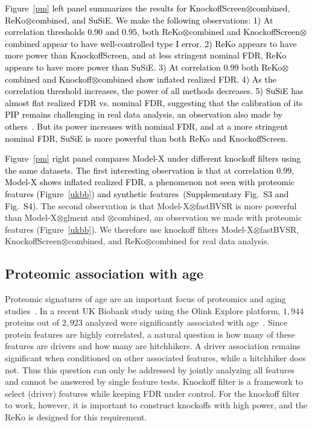 \documentclass[12pt,Times]{article}
\def\cite{\citep}
\def\tcb{\textcolor{black}}
\begin{document}
 \tcb{Figure~\ref{pm} left panel summarizes the results for KnockoffScreen\allowbreak$\otimes$combined,  ReKo$\otimes$combined, and SuSiE.  We make the following observations:  1) At correlation thresholds $0.90$ and $0.95$, both ReKo\allowbreak$\otimes$combined and KnockoffScreen\allowbreak$\otimes$combined  appear to have well-controlled type I error.  2) ReKo appears to have more power than KnockoffScreen, and at less stringent nominal FDR, ReKo appears to have more power than SuSiE.  3) At correlation $0.99$ both ReKo\allowbreak$\otimes$combined and Knockoff\allowbreak$\otimes$combined show inflated realized FDR.   4) As the correlation threshold increases, the power of all methods decreases. 5) SuSiE has almost flat realized FDR vs. nominal FDR, suggesting that the calibration of its PIP remains challenging in real data analysis, an observation also made by others~\cite{susie-inf}. But its power increases with nominal FDR, and at a more stringent nominal FDR, SuSiE is more powerful than both ReKo and KnockoffScreen. }

\tcb{Figure~\ref{pm} right panel compares Model-X under different knockoff filters using the same datasets. The first interesting observation is that at correlation $0.99$, Model-X shows inflated realized FDR, a phenomenon not seen with proteomic features (Figure~\ref{ukbb}) and synthetic features~(Supplementary Fig.~S3 and Fig.~S4). } The second observation is that Model-X\allowbreak$\otimes$fastBVSR is more powerful than Model-X\allowbreak$\otimes$glment and $\otimes$combined, an observation we made with proteomic features (Figure~\ref{ukbb}).  We therefore use knockoff filters Model-X\allowbreak$\otimes$fastBVSR, KnockoffScreen\allowbreak$\otimes$combined, and ReKo\allowbreak$\otimes$combined for real data analysis. 


\subsection{Proteomic association with age}
Proteomic signatures of age are an important focus of proteomics and aging studies~\cite{tanaka.etal.18,lehallier.etal.19,tanaka.etal.20,sun.etal.23}. 
In a recent UK Biobank study using the Olink Explore platform, $1,944$ proteins out of $2,923$ analyzed  were significantly associated with age~\cite{sun.etal.23}. 
Since protein features are highly correlated, a natural question is how many of these features are drivers and how many are hitchhikers. 
%
A driver association remains significant when conditioned on other associated features, while a hitchhiker does not. Thus this question can only be addressed by jointly analyzing all features and cannot be answered by single feature tests.   Knockoff filter is a framework to select (driver) features while keeping FDR under control. For the knockoff filter to work, however, it is important to construct knockoffs with high power, and the ReKo is designed for this requirement. 
 
\end{document}
